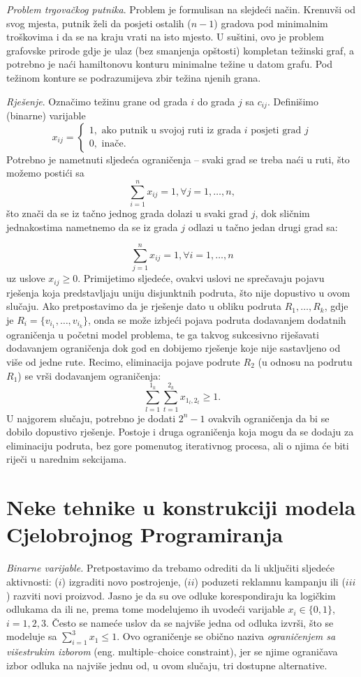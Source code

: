 \documentclass[a4paper, utf8, 11pt, colorlinks]{book}
\begin{document}
\emph{Problem trgovačkog putnika}. Problem je formulisan na slejdeći način. Krenuvši od svog mjesta, putnik želi da posjeti ostalih ($n-1$) gradova pod minimalnim troškovima i da se na kraju vrati na isto mjesto. U suštini, ovo je problem grafovske prirode gdje je ulaz (bez smanjenja opštosti) kompletan težinski graf, a potrebno je naći hamiltonovu konturu minimalne težine u datom grafu. Pod težinom konture se podrazumijeva zbir težina njenih grana. 

\emph{Rješenje}. Označimo težinu grane od grada $i$ do grada $j$ sa $c_{ij}$.  Definišimo (binarne) varijable 
$$x_{ij} = \begin{cases}
                1, \mbox{ ako putnik u svojoj ruti iz grada } i \mbox{ posjeti grad } j \\
                0, \mbox{ inače}. 
          \end{cases}$$ 
Potrebno je nametnuti sljedeća ograničenja -- svaki grad se treba naći u ruti,  što možemo postići sa 
$$  \sum_{i=1}^n x_{ij} = 1, \forall j =1,\ldots, n,$$ 
što znači da se iz tačno jednog grada dolazi u svaki grad $j$, dok sličnim jednakostima nametnemo da se iz grada $j$ odlazi u tačno jedan drugi grad sa:

$$  \sum_{j=1}^n x_{ij} = 1, \forall i =1,\ldots, n$$ 
 uz uslove $x_{ij}\geq 0$. Primijetimo sljedeće, ovakvi uslovi ne sprečavaju pojavu rješenja koja predstavljaju uniju disjunktnih podruta, što nije dopustivo u ovom slučaju. Ako pretpostavimo da je rješenje dato u obliku podruta $R_1, \ldots, R_k$, gdje je $R_i = \{ v_{i_1}, \ldots, v_{i_k} \}$, onda se može izbjeći pojava podruta dodavanjem dodatnih ograničenja u početni model problema, te ga takvog sukcesivno riješavati dodavanjem ograničenja dok god en dobijemo rješenje koje nije sastavljeno od više od jedne rute. Recimo, eliminacija pojave podrute $R_2$ (u odnosu na podrutu $R_1$) se vrši dodavanjem ograničenja:
 $$ \sum_{l=1}^{1_k}\sum_{t=1}^{2_k} x_{1_l, 2_t} \geq 1.$$
 U najgorem slučaju, potrebno je dodati $2^n-1$ ovakvih ograničenja da bi se dobilo dopustivo rješenje. Postoje i druga ograničenja koja mogu da se dodaju za eliminaciju podruta, bez gore pomenutog iterativnog procesa, ali o njima će biti riječi u narednim sekcijama. 
 
 \section{Neke tehnike u konstrukciji modela Cjelobrojnog Programiranja}
 
 \emph{Binarne varijable.} Pretpostavimo da trebamo odrediti da li uključiti sljedeće aktivnosti: ($i$) izgraditi novo postrojenje,
($ii$) poduzeti reklamnu kampanju ili ($iii$) razviti novi proizvod. Jasno je da su ove odluke korespondiraju ka logičkim odlukama da ili ne, prema tome modelujemo ih uvodeći  varijable $x_i \in \{0, 1 \}$, $i=1,2,3$. Često se nameće uslov da se najviše jedna od odluka izvrši, što se modeluje sa $\sum_{i=1}^3 x_1 \leq 1$. Ovo ograničenje se obično naziva \emph{ograničenjem sa višestrukim izborom} (eng. multiple--choice constraint), jer se njime ograničava izbor odluka na najviše jednu od, u ovom slučaju, tri dostupne alternative. 
\end{document}
